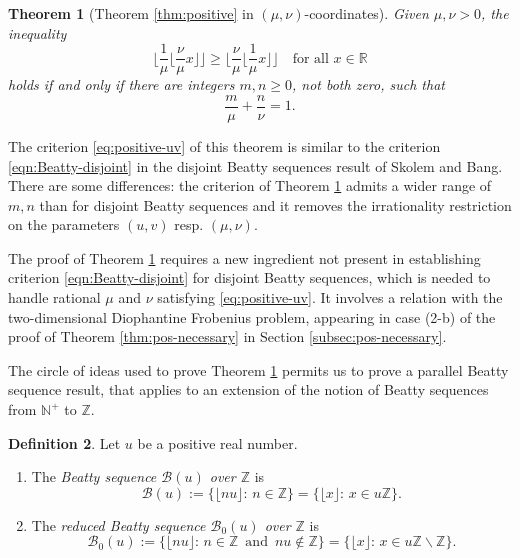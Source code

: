 \documentclass[11pt, letterpaper, reqno]{amsart}
\newtheorem{thm}{Theorem}[section]
\theoremstyle{definition}
\newtheorem{defi}[thm]{Definition}
\numberwithin{equation}{section}
\newcommand{\RR}{\ensuremath{\mathbb{R}}}
\newcommand{\ZZ}{\ensuremath{\mathbb{Z}}}
\newcommand{\NN}{\mathbb{N}}
\newcommand{\sB}{\mathcal{B}}
\newcommand{\floor}[1]{\lfloor{#1}\rfloor}
\newcommand{\bfloor}[1]{\bigg\lfloor{#1}\bigg\rfloor}
\newcommand{\um}{{\mu}}
\newcommand{\vm}{{\nu}}
\begin{document}
\begin{thm}[Theorem \ref{thm:positive} in $(\um,\vm)$-coordinates]
\label{thm:positive-uv}
Given   $\um, \vm > 0$, the inequality
\[ 
\bfloor{\frac{1}{\um} \bfloor{\frac{\vm}{\um} x}} \geq \bfloor{\frac{\vm}{\um} \bfloor{\frac{1}{\um} x}} 
\quad\text{for all }x\in\RR
\]
holds if and only if 
there are integers $m, n\geq 0$, not both zero, such that 
\begin{equation}\label{eq:positive-uv}
\frac{m}{\um} + \frac{n}{\vm} = 1.
\end{equation}
\end{thm}

The criterion \eqref{eq:positive-uv} of this theorem is similar to the criterion 
\eqref{eqn:Beatty-disjoint} in the disjoint Beatty sequences result of Skolem and Bang. 
There are some differences: 
the  criterion of Theorem \ref{thm:positive-uv}
admits a wider range of $m, n$  than  for disjoint Beatty sequences
and it removes the irrationality restriction on the parameters $(u,v)$ resp. $(\um,\vm)$. 

The proof of Theorem \ref{thm:positive-uv}
requires a new ingredient not present  in establishing  criterion 
\eqref{eqn:Beatty-disjoint} for disjoint Beatty sequences, which is
needed to handle  rational $\um$ and $\vm$ satisfying \eqref{eq:positive-uv}.
It involves a relation  with the two-dimensional Diophantine Frobenius problem,
appearing in case (2-b) of the proof of Theorem \ref{thm:pos-necessary} 
in Section \ref{subsec:pos-necessary}.

The circle of ideas used to prove Theorem \ref{thm:positive-uv}
permits us to prove a parallel Beatty sequence result, 
that applies to an extension of the notion of Beatty sequences from $\NN^{+}$ to $\ZZ$.

\begin{defi}\label{def:45}
Let $u$ be a positive real number.
\begin{enumerate}
\item
The {\em  Beatty sequence $\sB(u)$  over $\ZZ$} is 
$$
\sB(u) := \{ \floor {n u} : \,  n \in \ZZ \} = \{ \floor {x} : \,  x \in u\ZZ \} .
$$

\item 
The  {\em reduced  Beatty sequence $\sB_0(u)$  over $\ZZ$}  is
$$
\sB_0(u) := \{ \floor {n u} : \,  n \in \ZZ \, \mbox{ and } \, nu \not\in \ZZ\} 
= \{ \floor{ x } : \,  x \in u\ZZ \smallsetminus \ZZ\}.
$$
\end{enumerate}
\end{defi}
\end{document}
